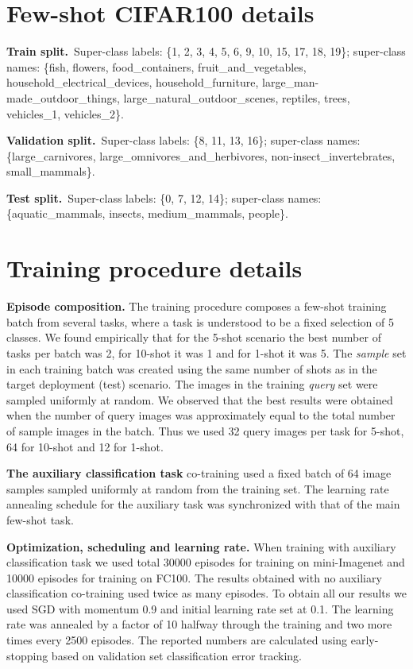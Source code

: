 \documentclass{article}
\begin{document}
\section{Few-shot CIFAR100 details} \label{sec:fc100_details}

\textbf{Train split.}~Super-class labels: \{1, 2, 3, 4, 5, 6, 9, 10, 15, 17, 18, 19\}; super-class names: \{fish, flowers, food\_containers, fruit\_and\_vegetables, household\_electrical\_devices, household\_furniture, large\_man-made\_outdoor\_things, large\_natural\_outdoor\_scenes, reptiles, trees, vehicles\_1, vehicles\_2\}. 

\textbf{Validation split.}~Super-class labels: \{8, 11, 13, 16\}; super-class names: \{large\_carnivores, large\_omnivores\_and\_herbivores, non-insect\_invertebrates, small\_mammals\}.

\textbf{Test split.}~Super-class labels: \{0, 7, 12, 14\}; super-class names: \{aquatic\_mammals, insects, medium\_mammals, people\}.


\section{Training procedure details} \label{ssec:training_procedure_details}

\textbf{Episode composition.} The training procedure composes a few-shot training batch from several tasks, where a task is understood to be a fixed selection of 5 classes. We found empirically that for the 5-shot scenario the best number of tasks per batch was 2, for 10-shot it was 1 and for 1-shot it was 5. The \emph{sample} set in each training batch was created using the same number of shots as in the target deployment (test) scenario. The images in the training \emph{query} set were sampled uniformly at random. We observed that the best results were obtained when the number of query images was approximately equal to the total number of sample images in the batch. Thus we used 32 query images per task for 5-shot, 64 for 10-shot and 12 for 1-shot. 

\textbf{The auxiliary classification task} co-training used a fixed batch of 64 image samples sampled uniformly at random from the training set. The learning rate annealing schedule for the auxiliary task was synchronized with that of the main few-shot task.

\textbf{Optimization, scheduling and learning rate.} When training with auxiliary classification task we used total 30000 episodes for training on mini-Imagenet and 10000 episodes for training on FC100. The results obtained with no auxiliary classification co-training used twice as many episodes. To obtain all our results we used SGD with momentum 0.9 and initial learning rate set at 0.1. The learning rate was annealed by a factor of 10 halfway through the training and two more times every 2500 episodes. The reported numbers are calculated using early-stopping based on validation set classification error tracking.
\end{document}
